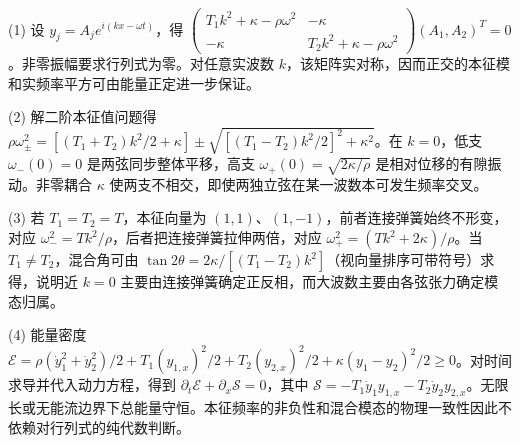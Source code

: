 (1) 设 \(y_j=A_j e^{i(kx-\omega t)}\)，得 \(\begin{pmatrix}T_1k^2+\kappa-\rho\omega^2&-\kappa\\-\kappa&T_2k^2+\kappa-\rho\omega^2\end{pmatrix}(A_1,A_2)^T=0\)。非零振幅要求行列式为零。对任意实波数 \(k\)，该矩阵实对称，因而正交的本征模和实频率平方可由能量正定进一步保证。

(2) 解二阶本征值问题得 \(\rho\omega_\pm^2=[(T_1+T_2)k^2/2+\kappa]\pm\sqrt{[(T_1-T_2)k^2/2]^2+\kappa^2}\)。在 \(k=0\)，低支 \(\omega_-(0)=0\) 是两弦同步整体平移，高支 \(\omega_+(0)=\sqrt{2\kappa/\rho}\) 是相对位移的有隙振动。非零耦合 \(\kappa\) 使两支不相交，即使两独立弦在某一波数本可发生频率交叉。

(3) 若 \(T_1=T_2=T\)，本征向量为 \((1,1)\)、\((1,-1)\)，前者连接弹簧始终不形变，对应 \(\omega_-^2=Tk^2/\rho\)，后者把连接弹簧拉伸两倍，对应 \(\omega_+^2=(Tk^2+2\kappa)/\rho\)。当 \(T_1\ne T_2\)，混合角可由 \(\tan2\theta=2\kappa/[(T_1-T_2)k^2]\)（视向量排序可带符号）求得，说明近 \(k=0\) 主要由连接弹簧确定正反相，而大波数主要由各弦张力确定模态归属。

(4) 能量密度 \(\mathcal E=\rho(\dot y_1^2+\dot y_2^2)/2+T_1(y_{1,x})^2/2+T_2(y_{2,x})^2/2+\kappa(y_1-y_2)^2/2\ge0\)。对时间求导并代入动力方程，得到 \(\partial_t\mathcal E+\partial_x\mathcal S=0\)，其中 \(\mathcal S=-T_1\dot y_1y_{1,x}-T_2\dot y_2y_{2,x}\)。无限长或无能流边界下总能量守恒。本征频率的非负性和混合模态的物理一致性因此不依赖对行列式的纯代数判断。
